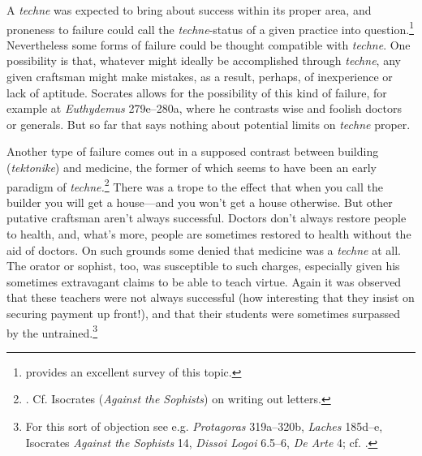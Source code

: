 ﻿\documentclass[11pt]{amsart}
\begin{document}


A \emph{techne} was expected to bring about success within its proper area, and proneness to failure could call the \emph{techne}-status of a given practice into question.\footnote{\citet{allen1994} provides an excellent survey of this topic.} Nevertheless some forms of failure could be thought compatible with \emph{techne}. One possibility is that, whatever might ideally be accomplished through \emph{techne}, any given craftsman might make mistakes, as a result, perhaps, of inexperience or lack of aptitude. Socrates allows for the possibility of this kind of failure, for example at \emph{Euthydemus} 279e--280a, where he contrasts wise and foolish doctors or generals. But so far that says nothing about potential limits on \emph{techne} proper. 

Another type of failure comes out in a supposed contrast between building (\emph{tektonike}) and medicine, the former of which seems to have been an early paradigm of \emph{techne.}\footnote{\citet[19--20]{roochnik1986}. Cf. Isocrates (\emph{Against the Sophists}) on writing out letters.} There was a trope to the effect that when you call the builder you will get a house---and you won't get a house otherwise. But other putative craftsman aren't always successful. Doctors don't always restore people to health, and, what's more, people are sometimes restored to health without the aid of doctors. On such grounds some denied that medicine was a \emph{techne} at all. The orator or sophist, too, was susceptible to such charges, especially given his sometimes extravagant claims to be able to teach virtue. Again it was observed that these teachers were not always successful (how interesting that they insist on securing payment up front!), and that their students were sometimes surpassed by the untrained.\footnote{For this sort of objection see e.g. \emph{Protagoras} 319a--320b, \emph{Laches} 185d--e, Isocrates \emph{Against the Sophists} 14, \emph{Dissoi Logoi} 6.5--6, \emph{De Arte} 4; cf. \citet[123--6]{heinimann1961vpt}.}

\end{document}
